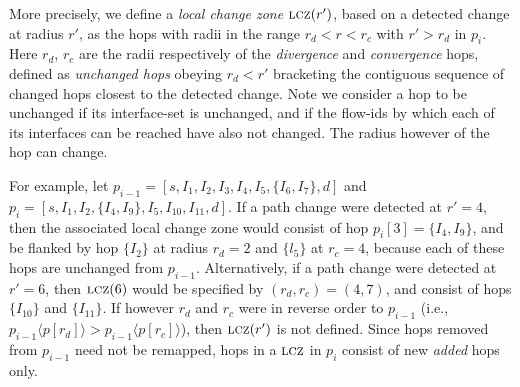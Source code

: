 
More precisely, we define a \emph{local change zone}  $\mathrm{\textsc{lcz}}(r')$, based
on a detected change at radius $r'$, as the hops with radii in the range
$r_d<r<r_c$ with $r'>r_d$ in $p_i$.  Here  $r_d$, $r_c$ are the radii
respectively of the \emph{divergence} and \emph{convergence} hops,
defined as \emph{unchanged hops} obeying $r_d<r'$ bracketing the
contiguous sequence of changed hops closest to the detected change.
Note we consider a hop to be unchanged if its interface-set is
unchanged, and if the flow-ids by which each of its interfaces can be
reached have also not changed.  The radius however of the hop can
change.

For example, let $p_{i-1} = [s,I_1, I_2, I_3, I_4,I_5, \{I_6, I_7\}, d]$
and $p_i= [s,I_1, I_2, \{I_4,I_9\}, I_5, I_{10},I_{11}, d]$.  If a path
change were detected at $r'=4$, then the associated local change zone
would consist of hop $p_i[3]=\{I_4,I_9\}$, and be flanked by hop
$\{I_2\}$ at radius $r_d = 2$ and $\{l_5\}$ at $r_c=4$, because each of
these hops are unchanged from $p_{i-1}$.  Alternatively, if a path
change were detected at $r'=6$, then $\mathrm{\textsc{lcz}}(6)$ would be specified by
$(r_d,r_c)=(4,7)$, and consist of hops $\{I_{10}\}$ and $\{I_{11}\}$.  If
however $r_d$ and $r_c$ were in reverse order to $p_{i-1}$ (i.e.,
$p_{i-1}\langle p[r_d]\rangle > p_{i-1}\langle p[r_c]\rangle$), then
$\mathrm{\textsc{lcz}}(r')$ is not defined.  Since hops removed from $p_{i-1}$ need not
be remapped, hops in a $\mathrm{\textsc{lcz}}$ in $p_i$ consist of new \textit{added}
hops only.



